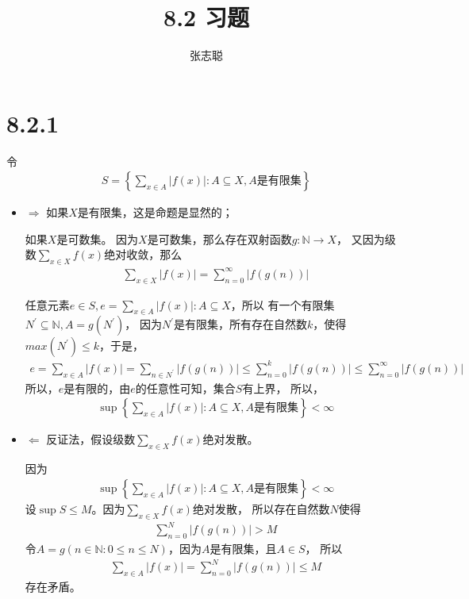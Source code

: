 \documentclass{article}
\begin{document}
\title{8.2 习题}
\author{张志聪}
\maketitle

\section*{8.2.1}

令
\begin{align*}
  S = \left \{ \sum \limits_{x \in A} |f(x)|: A \subseteq X , A \text{是有限集} \right \}
\end{align*}

\begin{itemize}
  \item $\Rightarrow$
        如果$X$是有限集，这是命题是显然的；

        如果$X$是可数集。
        因为$X$是可数集，那么存在双射函数$g: \mathbb{N} \rightarrow X $，
        又因为级数$\sum \limits_{x \in X}f(x)$绝对收敛，那么
        \begin{align*}
          \sum \limits_{x \in X} |f(x)| = \sum \limits_{n=0}^\infty |f(g(n))|
        \end{align*}

        任意元素$e \in S, e = \sum \limits_{x \in A} |f(x)|: A \subseteq X$，所以
        有一个有限集$N^\prime \subseteq \mathbb{N}, A = g(N^\prime)$，
        因为$N^\prime$是有限集，所有存在自然数$k$，使得$max(N^\prime) \leq k$，于是，
        \begin{align*}
          e = \sum \limits_{x \in A} |f(x)| = \sum \limits_{n \in N^\prime} |f(g(n))| \leq \sum \limits_{n=0}^k |f(g(n))| \leq \sum \limits_{n=0}^\infty |f(g(n))|
        \end{align*}
        所以，$e$是有限的，由$e$的任意性可知，集合$S$有上界，
        所以，
        \begin{align*}
          \sup \left \{ \sum \limits_{x \in A} |f(x)|: A \subseteq X , A \text{是有限集} \right \} < \infty
        \end{align*}
  \item $\Leftarrow$
        反证法，假设级数$\sum \limits_{x \in X}f(x)$绝对发散。

        因为
        \begin{align*}
          \sup \left \{ \sum \limits_{x \in A} |f(x)|: A \subseteq X , A \text{是有限集} \right \} < \infty
        \end{align*}
        设$\sup S \leq M$。因为$\sum \limits_{x \in X}f(x)$绝对发散，
        所以存在自然数$N$使得
        \begin{align*}
          \sum \limits_{n=0}^N |f(g(n))| > M
        \end{align*}
        令$A = g({n \in \mathbb{N}: 0 \leq n \leq N})$，因为$A$是有限集，且$A \in S$，
        所以
        \begin{align*}
          \sum \limits_{x \in A} |f(x)| = \sum \limits_{n=0}^N |f(g(n))| \leq M
        \end{align*}
        存在矛盾。
\end{itemize}
\end{document}
